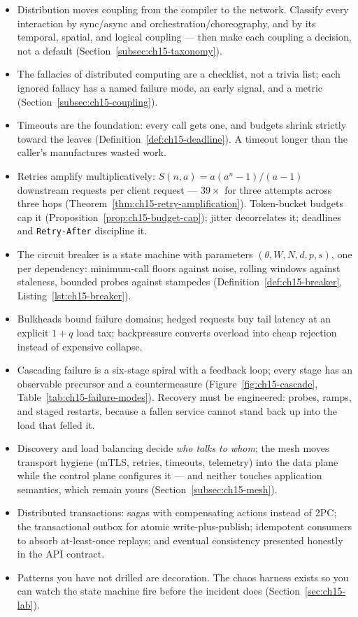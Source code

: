 \begin{itemize}
  \item Distribution moves coupling from the compiler to the network.
        Classify every interaction by sync/async and
        orchestration/choreography, and by its temporal, spatial, and
        logical coupling --- then make each coupling a decision, not a
        default (Section~\ref{subsec:ch15-taxonomy}).
  \item The fallacies of distributed computing are a checklist, not a
        trivia list; each ignored fallacy has a named failure mode, an
        early signal, and a metric (Section~\ref{subsec:ch15-coupling}).
  \item Timeouts are the foundation: every call gets one, and budgets
        shrink strictly toward the leaves
        (Definition~\ref{def:ch15-deadline}). A timeout longer than the
        caller's manufactures wasted work.
  \item Retries amplify multiplicatively: $S(n,a) = a(a^n-1)/(a-1)$
        downstream requests per client request --- $39\times$ for three
        attempts across three hops
        (Theorem~\ref{thm:ch15-retry-amplification}). Token-bucket budgets
        cap it (Proposition~\ref{prop:ch15-budget-cap}); jitter decorrelates
        it; deadlines and \texttt{Retry-After} discipline it.
  \item The circuit breaker is a state machine with parameters
        $(\theta, W, N, d, p, s)$, one per dependency: minimum-call floors
        against noise, rolling windows against staleness, bounded probes
        against stampedes (Definition~\ref{def:ch15-breaker},
        Listing~\ref{lst:ch15-breaker}).
  \item Bulkheads bound failure domains; hedged requests buy tail latency
        at an explicit $1 + q$ load tax; backpressure converts overload
        into cheap rejection instead of expensive collapse.
  \item Cascading failure is a six-stage spiral with a feedback loop; every
        stage has an observable precursor and a countermeasure
        (Figure~\ref{fig:ch15-cascade},
        Table~\ref{tab:ch15-failure-modes}). Recovery must be engineered:
        probes, ramps, and staged restarts, because a fallen service
        cannot stand back up into the load that felled it.
  \item Discovery and load balancing decide \emph{who talks to whom};
        the mesh moves transport hygiene (mTLS, retries, timeouts,
        telemetry) into the data plane while the control plane configures
        it --- and neither touches application semantics, which remain
        yours (Section~\ref{subsec:ch15-mesh}).
  \item Distributed transactions: sagas with compensating actions instead
        of 2PC; the transactional outbox for atomic write-plus-publish;
        idempotent consumers to absorb at-least-once replays; and eventual
        consistency presented honestly in the API contract.
  \item Patterns you have not drilled are decoration. The chaos harness
        exists so you can watch the state machine fire before the incident
        does (Section~\ref{sec:ch15-lab}).
\end{itemize}
